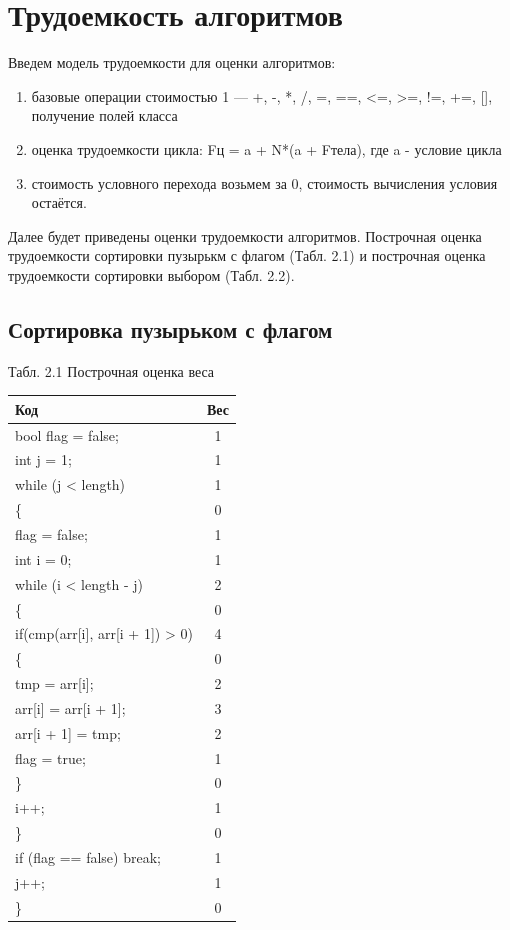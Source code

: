 \documentclass{report}
\begin{document}
\section{Трудоемкость алгоритмов}
Введем модель трудоемкости для оценки алгоритмов:
\begin{enumerate}
  	\item  базовые операции стоимостью 1 — +, -, *, /, =, ==, <=, >=, !=, +=, [], получение полей класса
	\item оценка трудоемкости цикла: Fц = a + N*(a + Fтела), где a - условие цикла
	\item стоимость условного перехода возьмем за 0, стоимость вычисления условия остаётся.
\end{enumerate}

Далее будет приведены оценки трудоемкости алгоритмов. Построчная оценка трудоемкости сортировки пузырькм с флагом (Табл. 2.1) и построчная оценка трудоемкости сортировки выбором (Табл. 2.2).

\subsection{Сортировка пузырьком с флагом}
\begin{center}
Табл. 2.1 Построчная оценка веса
	\begin{tabular}{|l c|} 
 	\hline
	Код & Вес \\ [0.5ex] 
 	\hline
	bool flag = false; & 1\\
	\hline
	int j = 1; & 1\\
 	\hline
	while (j < length) & 1\\
	\hline
	\{ & 0\\
	\hline
	flag = false; & 1\\
	\hline
	int i = 0; & 1\\
 	\hline
	while (i < length - j) & 2\\
	\hline
	\{ & 0\\	
	\hline
	if(cmp(arr[i], arr[i + 1]) > 0) & 4\\
	\hline
	\{ & 0\\
	\hline
	tmp = arr[i]; & 2\\
	\hline
    arr[i] = arr[i + 1]; & 3\\
    \hline
    arr[i + 1] = tmp; & 2\\
    \hline
    flag = true; & 1\\
    \hline
    \} & 0\\
	\hline
	i++; & 1\\
	\hline
	\} & 0\\
	\hline
	if (flag == false) break;  & 1\\
	\hline
	j++; & 1\\
	\hline
	\} & 0\\
	\hline
	\end{tabular}
\end{center}
\end{document}
